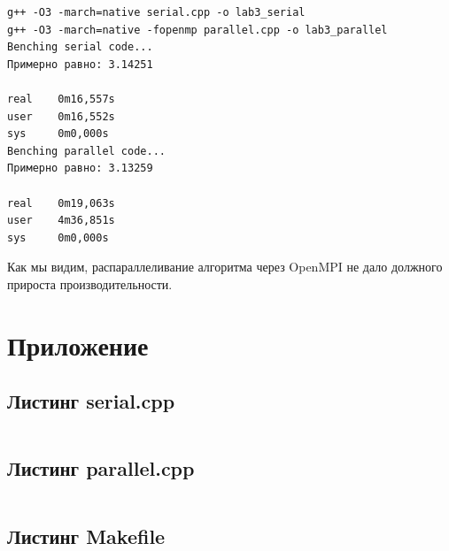 \documentclass[a4paper,14pt]{extarticle}
\begin{document}
\begin{verbatim}
g++ -O3 -march=native serial.cpp -o lab3_serial
g++ -O3 -march=native -fopenmp parallel.cpp -o lab3_parallel
Benching serial code...
Примерно равно: 3.14251

real    0m16,557s
user    0m16,552s
sys     0m0,000s
Benching parallel code...
Примерно равно: 3.13259

real    0m19,063s
user    4m36,851s
sys     0m0,000s
\end{verbatim}

Как мы видим, распараллеливание алгоритма через OpenMPI не дало должного прироста производительности.

\section*{Приложение}

\subsection*{Листинг serial.cpp}
\inputminted[mathescape,linenos,breaklines]{c++}{../src/serial.cpp}

\subsection*{Листинг parallel.cpp}
\inputminted[mathescape,linenos,breaklines]{c++}{../src/parallel.cpp}

\subsection*{Листинг Makefile}
\label{makefile}
\inputminted[mathescape,linenos,breaklines]{make}{../src/Makefile}
\end{document}
